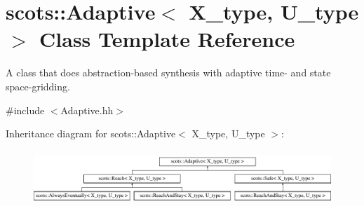 \hypertarget{classscots_1_1Adaptive}{}\section{scots\+:\+:Adaptive$<$ X\+\_\+type, U\+\_\+type $>$ Class Template Reference}
\label{classscots_1_1Adaptive}


A class that does abstraction-\/based synthesis with adaptive time-\/ and state space-\/gridding.  




{\ttfamily \#include $<$Adaptive.\+hh$>$}

Inheritance diagram for scots\+:\+:Adaptive$<$ X\+\_\+type, U\+\_\+type $>$\+:\begin{figure}[H]
\begin{center}
\leavevmode
\includegraphics[height=2.097378cm]{classscots_1_1Adaptive}
\end{center}
\end{figure}
